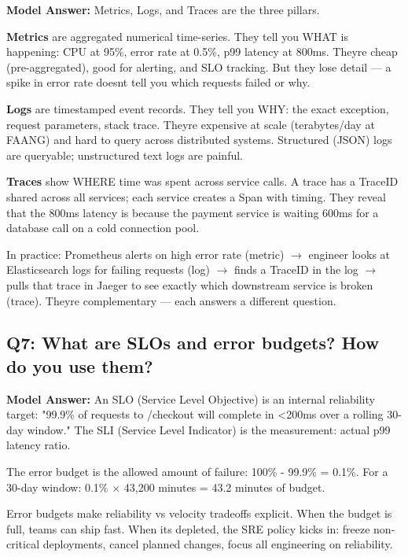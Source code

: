 \documentclass[11pt]{article}
\begin{document}
\textbf{Model Answer:}
Metrics, Logs, and Traces are the three pillars.

\textbf{Metrics} are aggregated numerical time-series. They tell you WHAT is happening: CPU at 95\%, error rate at 0.5\%, p99 latency at 800ms. They\textquotesingle re cheap (pre-aggregated), good for alerting, and SLO tracking. But they lose detail --- a spike in error rate doesn\textquotesingle t tell you which requests failed or why.

\textbf{Logs} are timestamped event records. They tell you WHY: the exact exception, request parameters, stack trace. They\textquotesingle re expensive at scale (terabytes/day at FAANG) and hard to query across distributed systems. Structured (JSON) logs are queryable; unstructured text logs are painful.

\textbf{Traces} show WHERE time was spent across service calls. A trace has a TraceID shared across all services; each service creates a Span with timing. They reveal that the 800ms latency is because the payment service is waiting 600ms for a database call on a cold connection pool.

In practice: Prometheus alerts on high error rate (metric) \(\rightarrow\) engineer looks at Elasticsearch logs for failing requests (log) \(\rightarrow\) finds a TraceID in the log \(\rightarrow\) pulls that trace in Jaeger to see exactly which downstream service is broken (trace). They\textquotesingle re complementary --- each answers a different question.

\subsection{Q7: What are SLOs and error budgets? How do you use them?}\label{q7-what-are-slos-and-error-budgets-how-do-you-use-them}

\textbf{Model Answer:}
An SLO (Service Level Objective) is an internal reliability target: "99.9\% of requests to /checkout will complete in \textless200ms over a rolling 30-day window." The SLI (Service Level Indicator) is the measurement: actual p99 latency ratio.

The error budget is the allowed amount of failure: 100\% - 99.9\% = 0.1\%. For a 30-day window: 0.1\% \(\times\) 43,200 minutes = 43.2 minutes of budget.

Error budgets make reliability vs velocity tradeoffs explicit. When the budget is full, teams can ship fast. When it\textquotesingle s depleted, the SRE policy kicks in: freeze non-critical deployments, cancel planned changes, focus all engineering on reliability.
\end{document}
